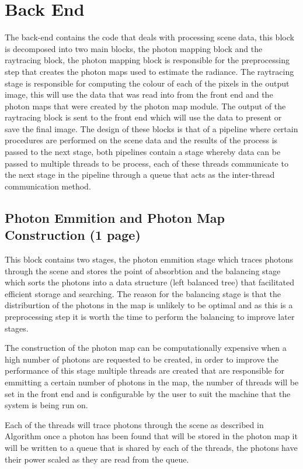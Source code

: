 \section{Back End}
The back-end contains the code that deals with processing scene data, this block is decomposed into
two main blocks, the photon mapping block and the raytracing block, the photon mapping block is responsible
for the preprocessing step that creates the photon maps used to estimate the radiance. The raytracing stage
is responsible for computing the colour of each of the pixels in the output image, this will use the data
that was read into from the front end and the photon maps that were created by the photon map module. The
output of the raytracing block is sent to the front end which will use the data to present or save the final
image. The design of these blocks is that of a pipeline where certain procedures are performed on the scene
data and the results of the process is passed to the next stage, both pipelines contain a stage whereby
data can be passed to multiple threads to be process, each of these threads communicate to the next
stage in the pipeline through a queue that acts as the inter-thread communication method.

\subsection{Photon Emmition and Photon Map Construction (1 page)}
This block contains two stages, the photon emmition stage which traces photons through the scene and stores
the point of absorbtion and the balancing stage which sorts the photons into a data structure (left balanced
tree) that facilitated efficient storage and searching. The reason for the balancing stage is that the
distriburtion of the photons in the map is unlikely to be optimal  and as this is a
preprocessing step it is worth the time to perform the balancing to improve later stages.

The construction of the photon map can be computationally expensive when a high number of photons are
requested to be created, in order to improve the performance of this stage multiple threads are created
that are responsible for emmitting a certain number of photons in the map, the number of threads will be
set in the front end and is configurable by the user to suit the machine that the system is being run on.

Each of the threads will trace photons through the scene as described in Algorithm
once a photon has been found that will be stored in the photon map it will be written to a queue that is shared
by each of the threads, the photons have their power scaled as they are read from the queue.

